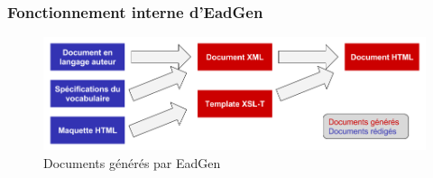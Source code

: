 \begin{frame}
	\frametitle{Fonctionnement interne d'EadGen}

	\begin{figure}
		\centering
		\includegraphics[scale=0.32]{resources/fctEadgen.png}
		\caption{Documents générés par EadGen}
	\end{figure}
\end{frame}

